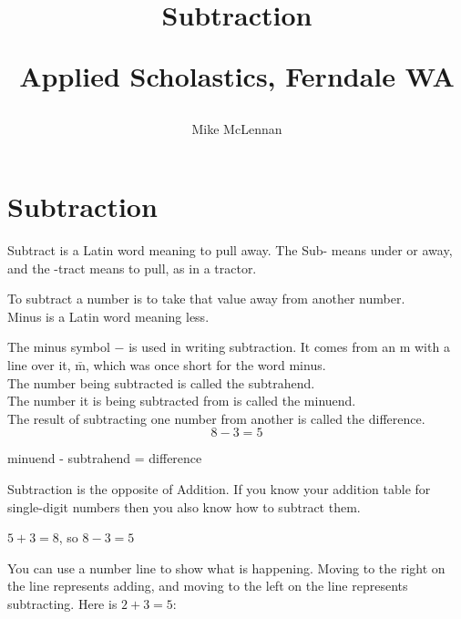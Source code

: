 \documentclass{article}
\author{Mike McLennan}
\date{}
\title{Subtraction\\
\vspace{28pt}
\begin{normalsize}Applied Scholastics, Ferndale WA \end{normalsize}}
\begin{document}
\maketitle
\pagebreak
\tableofcontents
\pagebreak

\section{Subtraction}
Subtract is a Latin word meaning to pull away. The Sub- means under or away, and the -tract means to pull, as in a tractor.

To subtract a number is to take that value away from another number.\\

Minus is a Latin word meaning less.

The minus symbol $-$ is used in writing subtraction. It comes from an m with a line over it, $\bar{\textrm{m}}$, which was once short for the word minus.\\

The number being subtracted is called the subtrahend.\\

The number it is being subtracted from is called the minuend.\\

The result of subtracting one number from another is called the difference.\\

$$8 - 3 = 5$$


minuend - subtrahend = difference

\newpage

Subtraction is the opposite of Addition. If you know your addition table for single-digit numbers then you also know how to subtract them.

\begin{center}
$5 + 3 = 8$, so $8 - 3 = 5$
\end{center}

\vspace{32pt}
You can use a number line to show what is happening. Moving to the right on the line represents adding, and moving to the left on the line represents subtracting. Here is $2+3=5$:\\

\begin{center}
\end{center}
\end{document}
